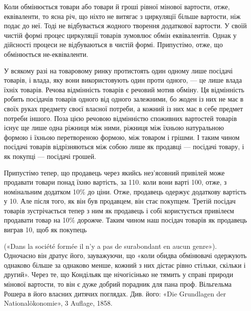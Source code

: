 Коли обмінюється товари або товари й гроші рівної мінової
вартости, отже, еквіваленти, то ясна річ, що ніхто не витягає
з циркуляції більше вартости, ніж подає до неї. Тоді не відбувається
жодного творення додаткової вартости. У своїй чистій
формі процес циркуляції товарів зумовлює обмін еквівалентів.
Однак у дійсності процеси не відбуваються в чистій формі. Припустімо,
отже, що обмінюється не-еквіваленти.

У всякому разі на товаровому ринку протистоять один одному
лише посідачі товарів, і влада, яку вони використовують один
проти одного, — це лише влада їхніх товарів. Речова відмінність
товарів є речовий мотив обміну. Ця відмінність робить посідачів
товарів одного від одного залежними, бо жоден із них не має в
своїх руках предмету своєї власної потреби, а кожний із них
має в себе предмет потреби іншого. Поза цією речовою відмінністю
споживних вартостей товарів існує ще лише одна ріжниця
між ними, ріжниця між їхньою натуральною формою і їхньою
перетвореною формою, між товаром і грішми. І таким чином
посідачі товарів відрізняються між собою лише як продавці —
посідачі товару, і як покупці — посідачі грошей.

Припустімо тепер, що продавець через якийсь нез’ясовний
привілей може продавати товари понад їхню вартість, за 110.
коли вони варті 100, отже, з номінальним додатком 10\% до ціни.
Отже, продавець одержує додаткову вартість у 10. Але після
того, як він був продавцем, він стає покупцем. Третій посідач
товарів зустрічається тепер з ним як продавець і собі користується
привілеєм продавати товар на 10\% дорожче. Таким чином
наш посідач товарів як продавець виграв 10, щоб як покупець

(«Dans la société formée il n’y a pas de surabondant en aucun genre»).
Одночасно він дратує його, зауважуючи, що «коли обидва обмінювачі
одержують однаково більше за однаково менше, кожний з них дістає
рівно стільки, скільки і другий». Через те, що Кондільяк ще нічогісінько
не тямить у справі природи мінової вартости, то він є дуже добрий порадник
для пана проф. Вільгельма Рошера в його власних дитячих поглядах.
Див. його: «Die Grundlagen der Nationalökonomie», 3 Auflage,
1858.
\parbreak{}  %
